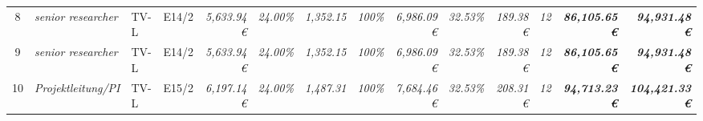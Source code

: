 \begin{table}[]
\begin{tabular}{clllcrrrrrrrrrr}
8                                                                                       & \multicolumn{2}{l}{\cellcolor[HTML]{FFFF99}\textit{senior researcher}}                & \cellcolor[HTML]{FFFF99}TV-L      & \cellcolor[HTML]{FFFF99}E14/2                & \cellcolor[HTML]{FFFF99}\textit{5,633.94 €}         & \textit{24.00\%}                                      & \textit{1,352.15}                            & \cellcolor[HTML]{FFFF99}\textit{100\%}                  & \cellcolor[HTML]{92D050}\textit{6,986.09 €}  & \cellcolor[HTML]{FFFF99}\textit{32.53\%}       & \cellcolor[HTML]{92D050}\textit{189.38 €}    & \cellcolor[HTML]{FFFF99}\textit{12}          & \cellcolor[HTML]{BFBFBF}\textit{\textbf{86,105.65 €}}           & \textit{\textbf{94,931.48 €}}                                                                 \\
9                                                                                       & \multicolumn{2}{l}{\cellcolor[HTML]{FFFF99}\textit{senior researcher}}                & \cellcolor[HTML]{FFFF99}TV-L      & \cellcolor[HTML]{FFFF99}E14/2                & \cellcolor[HTML]{FFFF99}\textit{5,633.94 €}         & \textit{24.00\%}                                      & \textit{1,352.15}                            & \cellcolor[HTML]{FFFF99}\textit{100\%}                  & \cellcolor[HTML]{92D050}\textit{6,986.09 €}  & \cellcolor[HTML]{FFFF99}\textit{32.53\%}       & \cellcolor[HTML]{92D050}\textit{189.38 €}    & \cellcolor[HTML]{FFFF99}\textit{12}          & \cellcolor[HTML]{BFBFBF}\textit{\textbf{86,105.65 €}}           & \textit{\textbf{94,931.48 €}}                                                                 \\
10                                                                                      & \multicolumn{2}{l}{\cellcolor[HTML]{FFFF99}\textit{Projektleitung/PI}}                & \cellcolor[HTML]{FFFF99}TV-L      & \cellcolor[HTML]{FFFF99}E15/2                & \cellcolor[HTML]{FFFF99}\textit{6,197.14 €}         & \textit{24.00\%}                                      & \textit{1,487.31}                            & \cellcolor[HTML]{FFFF99}\textit{100\%}                  & \cellcolor[HTML]{92D050}\textit{7,684.46 €}  & \cellcolor[HTML]{FFFF99}\textit{32.53\%}       & \cellcolor[HTML]{92D050}\textit{208.31 €}    & \cellcolor[HTML]{FFFF99}\textit{12}          & \cellcolor[HTML]{BFBFBF}\textit{\textbf{94,713.23 €}}           & \textit{\textbf{104,421.33 €}}                                                                \\

\end{tabular}
\end{table}
